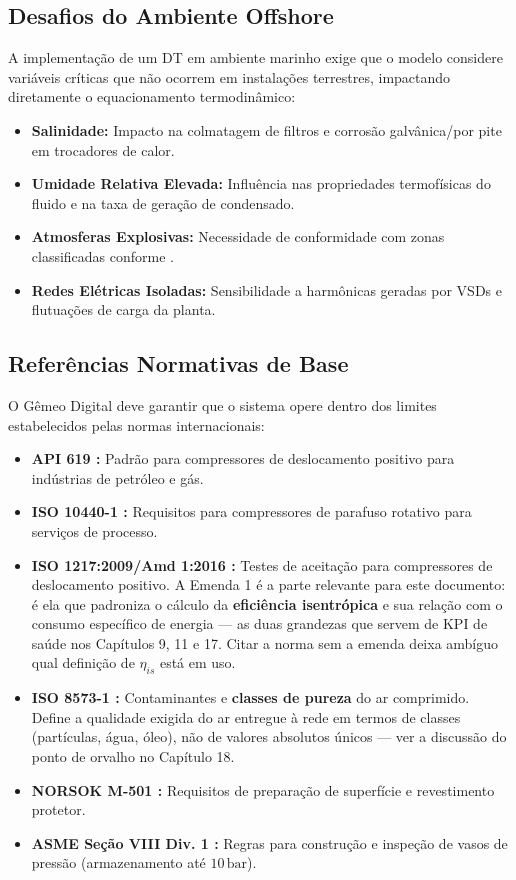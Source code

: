 \documentclass[12pt,a4paper]{article}
\numberwithin{equation}{section}
\numberwithin{table}{section}
\numberwithin{figure}{section}
\begin{document}
	\subsection{\textbf{Desafios do Ambiente Offshore}}
	A implementação de um DT em ambiente marinho exige que o modelo considere variáveis críticas que não ocorrem em instalações terrestres, impactando diretamente o equacionamento termodinâmico:
	
	\begin{itemize}
		\item \textbf{Salinidade:} Impacto na colmatagem de filtros e corrosão galvânica/por pite em trocadores de calor.
		\item \textbf{Umidade Relativa Elevada:} Influência nas propriedades termofísicas do fluido e na taxa de geração de condensado.
		\item \textbf{Atmosferas Explosivas:} Necessidade de conformidade com zonas classificadas conforme  \cite{iec60079}.
		\item \textbf{Redes Elétricas Isoladas:} Sensibilidade a harmônicas geradas por VSDs e flutuações de carga da planta.
	\end{itemize}
	
	\subsection{\textbf{Referências Normativas de Base}}
	O Gêmeo Digital deve garantir que o sistema opere dentro dos limites estabelecidos pelas normas internacionais:
	
	\begin{itemize}
		\item \textbf{API 619 \cite{api619}:} Padrão para compressores de deslocamento positivo para indústrias de petróleo e gás.
		\item \textbf{ISO 10440-1 \cite{iso10440}:} Requisitos para compressores de parafuso rotativo para serviços de processo.
		\item \textbf{ISO 1217:2009/Amd 1:2016 \cite{iso1217}:} Testes de aceitação para compressores de deslocamento positivo. A Emenda 1 é a parte relevante para este documento: é ela que padroniza o cálculo da \textbf{eficiência isentrópica} e sua relação com o consumo específico de energia — as duas grandezas que servem de KPI de saúde nos Capítulos 9, 11 e 17. Citar a norma sem a emenda deixa ambíguo qual definição de $\eta_{is}$ está em uso.
		\item \textbf{ISO 8573-1 \cite{iso8573}:} Contaminantes e \textbf{classes de pureza} do ar comprimido. Define a qualidade exigida do ar entregue à rede em termos de classes (partículas, água, óleo), não de valores absolutos únicos — ver a discussão do ponto de orvalho no Capítulo 18.
		\item \textbf{NORSOK M-501 \cite{norsok}:} Requisitos de preparação de superfície e revestimento protetor.
		\item \textbf{ASME Seção VIII Div. 1 \cite{asme8}:} Regras para construção e inspeção de vasos de pressão (armazenamento até $10\,\text{bar}$).
	\end{itemize}
\end{document}
